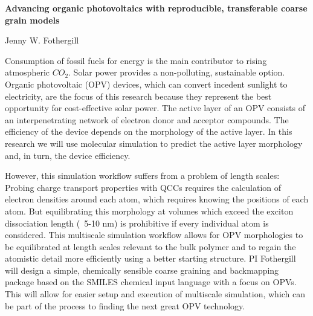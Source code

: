 \documentclass{article}
\begin{document}
\begin{center}
    \large{\textbf{Advancing organic photovoltaics with reproducible, transferable coarse grain models}}
\end{center}
\begin{center}
    Jenny W. Fothergill
\end{center}

Consumption of fossil fuels for energy is the main contributor to rising atmospheric $CO_{2}$. 
Solar power provides a non-polluting, sustainable option.
Organic photovoltaic (OPV) devices, which can convert incedent sunlight to electricity, are the focus of this research because they represent the best opportunity for cost-effective solar power.
The active layer of an OPV consists of an interpenetrating network of electron donor and acceptor compounds.
The efficiency of the device depends on the morphology of the active layer.
In this research we will use molecular simulation to predict the active layer morphology and, in turn, the device efficiency.

However, this simulation workflow suffers from a problem of length scales:
Probing charge transport properties with QCCs requires the calculation of electron densities around each atom, which requires knowing the positions of each atom.
But equilibrating this morphology at volumes which exceed the exciton dissociation length (~5-10 nm) is prohibitive if every individual atom is considered.
This multiscale simulation workflow allows for OPV morphologies to be equilibrated at length scales relevant to the bulk polymer and to regain the atomistic detail more efficiently using a better starting structure.
PI Fothergill will design a simple, chemically sensible coarse graining and backmapping package based on the SMILES chemical input language with a focus on OPVs.
This will allow for easier setup and execution of multiscale simulation, which can be part of the process to finding the next great OPV technology.
\end{document}
